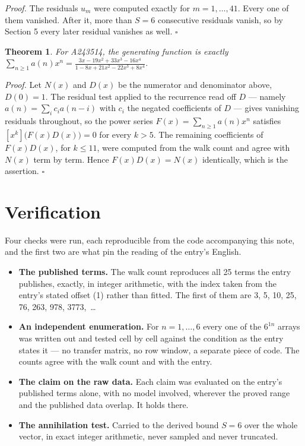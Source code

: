 \documentclass[11pt]{article}
\newtheorem{theorem}{Theorem}
\theoremstyle{definition}
\begin{document}
{\itshape Proof.} The residuals $u_m$ were computed exactly for $m = 1,\dots,41$. Every one of them vanished. After it, more than $S = 6$ consecutive residuals vanish, so by Section 5 every later residual vanishes as well. $\square$

\begin{theorem} For A243514, the generating function is exactly $\sum_{n\ge 1} a(n)x^n = \frac{3x - 19x^{2} + 33x^{3} - 16x^{4}}{1 - 8x + 21x^{2} - 22x^{3} + 8x^{4}}$.\end{theorem}

{\itshape Proof.} Let $N(x)$ and $D(x)$ be the numerator and denominator above, $D(0)=1$. The residual test applied to the recurrence read off $D$ --- namely $a(n) = \sum_i c_i a(n-i)$ with $c_i$ the negated coefficients of $D$ --- gives vanishing residuals throughout, so the power series $F(x)=\sum_{n\ge 1}a(n)x^n$ satisfies $[x^k]\bigl(F(x)D(x)\bigr) = 0$ for every $k > 5$. The remaining coefficients of $F(x)D(x)$, for $k \le 11$, were computed from the walk count and agree with $N(x)$ term by term. Hence $F(x)D(x) = N(x)$ identically, which is the assertion. $\square$

\section{Verification}

Four checks were run, each reproducible from the code accompanying this note, and the first two are what pin the reading of the entry's English.

\begin{itemize}

\item {\bfseries The published terms.} The walk count reproduces all 25 terms the entry publishes, exactly, in integer arithmetic, with the index taken from the entry's stated offset (1) rather than fitted. The first of them are 3, 5, 10, 25, 76, 263, 978, 3773,~\dots

\item {\bfseries An independent enumeration.} For $n = 1,\dots,6$ every one of the $6^{1n}$ arrays was written out and tested cell by cell against the condition as the entry states it --- no transfer matrix, no row window, a separate piece of code. The counts agree with the walk count and with the entry.

\item {\bfseries The claim on the raw data.} Each claim was evaluated on the entry's published terms alone, with no model involved, wherever the proved range and the published data overlap. It holds there.

\item {\bfseries The annihilation test.} Carried to the derived bound $S = 6$ over the whole vector, in exact integer arithmetic, never sampled and never truncated.

\end{itemize}
\end{document}

